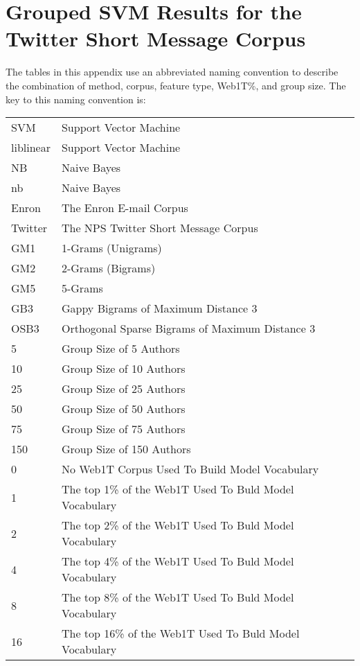 \chapter{Grouped SVM Results for the Twitter Short Message Corpus}

The tables in this appendix use an abbreviated naming convention to describe the combination of method, corpus, feature type, Web1T\%, and group size.  The key to this naming convention is:

\begin{center}
\begin{table}[htbp!]
	\begin{center}
	\begin{tabular}{ll}
	SVM & Support Vector Machine\\
	liblinear & Support Vector Machine\\
	NB & Naive Bayes\\
	nb & Naive Bayes\\
	
	Enron & The Enron E-mail Corpus\\
	Twitter & The NPS Twitter Short Message Corpus\\
	
	GM1 & 1-Grams (Unigrams)\\
	GM2 & 2-Grams (Bigrams)\\
	GM5 & 5-Grams\\
	GB3 & Gappy Bigrams of Maximum Distance 3\\
	OSB3 & Orthogonal Sparse Bigrams of Maximum Distance 3\\
		
	5 & Group Size of 5 Authors\\
	10 & Group Size of 10 Authors\\
	25 & Group Size of 25 Authors\\
	50 & Group Size of 50 Authors\\
	75 & Group Size of 75 Authors\\
	150 & Group Size of 150 Authors\\
	
	0 & No Web1T Corpus Used To Build Model Vocabulary\\
	1 & The top 1\% of the Web1T Used To Buld Model Vocabulary\\
	2 & The top 2\% of the Web1T Used To Buld Model Vocabulary\\
	4 & The top 4\% of the Web1T Used To Buld Model Vocabulary\\
	8 & The top 8\% of the Web1T Used To Buld Model Vocabulary\\
	16 & The top 16\% of the Web1T Used To Buld Model Vocabulary\\
	\end{tabular}
	\end{center}
\end{table}
\end{center}


